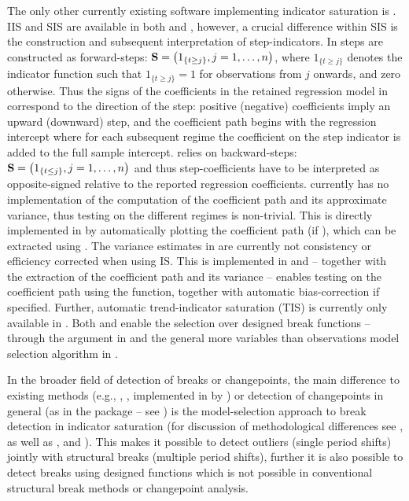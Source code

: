 \documentclass[article,nojss]{jss}
\begin{document}
The only other currently existing software implementing indicator
saturation is . IIS and SIS are available in both
 and , however, a crucial difference within
SIS is the construction and subsequent interpretation of
step-indicators. In  steps are constructed as forward-steps:
${\bf S} = \left( 1_{\{t \geq j\}}, j=1,\ldots,n\right)$, where
$1_{\{t \geq j \}}$ denotes the indicator function such that
$1_{ \{t \geq j\}}=1$ for observations from $j$ onwards, and zero
otherwise. Thus the signs of the coefficients in the retained
regression model in  correspond to the direction of the
step: positive (negative) coefficients imply an upward (downward)
step, and the coefficient path begins with the regression intercept
where for each subsequent regime the coefficient on the step indicator
is added to the full sample intercept.  relies on
backward-steps: ${\bf S} = \left( 1_{\{t \leq j\}}, j=1,\ldots,n\right)$
and thus step-coefficients have to be interpreted as opposite-signed
relative to the reported regression coefficients. 
currently has no implementation of the computation of the coefficient
path and its approximate variance, thus testing on the different
regimes is non-trivial. This is directly implemented in  by
automatically plotting the coefficient path (if ),
which can be extracted using . The variance estimates in
 are currently not consistency or efficiency
corrected when using IS. This is implemented in  and --
together with the extraction of the coefficient path and its variance
-- enables testing on the coefficient path using the 
function, together with automatic bias-correction if
specified. Further, automatic trend-indicator saturation (TIS) is
currently only available in . Both  and
 enable the selection over designed break functions --
through the argument  in  and the general more
variables than observations model selection algorithm in
.

In the broader field of detection of breaks or changepoints, the main difference to existing methods (e.g., \citealt{bai1998estimating}, \citealt{bai2003computation}, \citealt{perron2006dealing} implemented in  by \citealt{kleiber2002strucchange}) or detection of changepoints in general (as in the package  -- see \citealt{killick2014changepoint}) is the model-selection approach to break detection in indicator saturation (for discussion of methodological differences see \citealt{castle2015detecting}, as well as \citealt{HendryJohansenSantos2007}, and \citealt{johansen2016asymptotic}). This makes it possible to detect outliers (single period shifts) jointly with structural breaks (multiple period shifts), further it is also possible to detect breaks using designed functions \citep{pretis_volc16} which is not possible in conventional structural break methods or changepoint analysis. 
\end{document}

